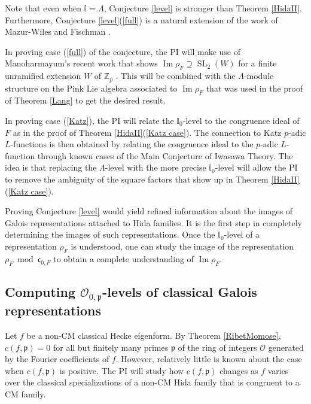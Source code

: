 \documentclass[11pt]{amsart}
\theoremstyle{definition}
\theoremstyle{remark}
\def\cc{\mathfrak{c}}
\def\I{\mathbb{I}}
\def\OK{\mathcal{O}}
\def\p{\mathfrak{p}}
\def\Z{\mathbb{Z}}
\DeclareMathOperator{\im}{Im}
\DeclareMathOperator{\SL}{SL}
\begin{document}
Note that even when $\I = \Lambda$, Conjecture \ref{level} is stronger than Theorem \ref{HidaII}.  Furthermore, Conjecture \ref{level}(\ref{full}) is a natural extension of the work of  Mazur-Wiles \cite{MazurWiles86} and Fischman \cite{Fischman02}.

In proving case (\ref{full}) of the conjecture, the PI will make use of Manoharmayum's recent work that shows $\im \rho_F \supseteq \SL_2(W)$ for a finite unramified extension $W$ of $\Z_p$ \cite{Manoharmayum15}.  This will be combined with the $\Lambda$-module structure on the Pink Lie algebra associated to $\im \rho_F$ that was used in the proof of Theorem \ref{Lang} to get the desired result.

In proving case (\ref{Katz}), the PI will relate the $\I_0$-level to the congruence ideal of $F$ as in the proof of Theorem \ref{HidaII}(\ref{Katz case}).  The connection to Katz $p$-adic $L$-functions is then obtained by relating the congruence ideal to the $p$-adic $L$-function through known cases of the Main Conjecture of Iwasawa Theory.  The idea is that replacing the $\Lambda$-level with the more precise $\I_0$-level will allow the PI to remove the ambiguity of the square factors that show up in Theorem \ref{HidaII}(\ref{Katz case}).

Proving Conjecture \ref{level} would yield refined information about the images of Galois representations attached to Hida families.  It is the first step in completely determining the images of such representations.  Once the $\I_0$-level of a representation $\rho_F$ is understood, one can study the image of the representation $\rho_F \bmod \cc_{0,F}$ to obtain a complete understanding of $\im \rho_F$.

\subsection*{Computing $\OK_{0, \p}$-levels of classical Galois representations}\label{classical images}
Let $f$ be a non-CM classical Hecke eigenform.  By Theorem \ref{RibetMomose}, $c(f, \p) = 0$ for all but finitely many primes $\p$ of the ring of integers $\OK$ generated by the Fourier coefficients of $f$.  However, relatively little is known about the case when $c(f, \p)$ is positive.  The PI will study how $c(f, \p)$ changes as $f$ varies over the classical specializations of a non-CM Hida family that is congruent to a CM family.
\end{document}
